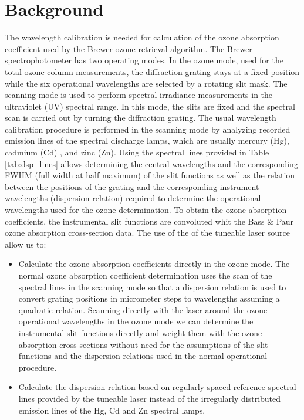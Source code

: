 \documentclass[acp]{copernicus} %
\begin{document}

\section{Background}

The wavelength calibration is needed for calculation of the ozone absorption coefficient used by the Brewer ozone retrieval algorithm. The Brewer spectrophotometer has two operating  modes. In the ozone mode, used for the total ozone column measurements, the diffraction grating stays at a fixed position while the six operational wavelengths are selected by a rotating slit mask.  The scanning mode is used to perform spectral irradiance measurements in the ultraviolet (UV) spectral range. In this mode, the slits are fixed and the spectral scan is carried out by turning the diffraction grating. The usual wavelength calibration procedure is performed in the scanning mode by analyzing recorded emission lines of the spectral discharge lamps, which are usually mercury (Hg), cadmium (Cd) , and zinc (Zn). Using the spectral lines provided in Table \ref{tab:dsp_lines} allows determining the central wavelengths and the corresponding FWHM (full width at half maximum) of the slit functions as well as the relation between the positions of the grating  and the corresponding instrument wavelengths (dispersion relation) required to determine the operational wavelengths used for the ozone determination. To obtain the ozone absorption coefficients, the instrumental slit functions are convoluted whit the Bass \& Paur ozone absorption cross-section data.
The use of the of the tuneable laser  source allow us to:
\begin{itemize}

    \item Calculate the ozone absorption coefficients directly in the ozone mode. The normal ozone absorption coefficient determination uses the scan of the spectral lines in the scanning mode so that a dispersion relation is used to convert grating positions in micrometer steps to wavelengths assuming a quadratic relation. Scanning directly with the laser around the ozone operational wavelengths in the ozone mode we can determine the instrumental slit functions directly and weight them with the ozone absorption cross-sections without need for the assumptions of the slit functions and the dispersion relations used in the normal operational procedure.
    \item Calculate the dispersion relation based on regularly spaced reference spectral lines provided by the tuneable laser instead of the irregularly distributed  emission lines of the  Hg, Cd and Zn spectral lamps. 
\end{itemize}
\end{document}

